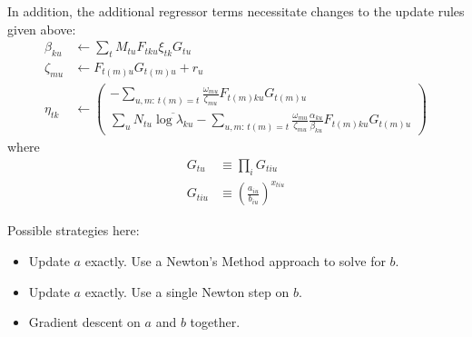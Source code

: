 \documentclass[11pt]{article}
\begin{document}
 In addition, the additional regressor terms necessitate changes to the update rules given above:
\begin{align}
    \beta_{ku} &\leftarrow \sum_t M_{tu} F_{tku} \xi_{tk} G_{tu} \\
    \zeta_{mu} &\leftarrow F_{t(m)u} G_{t(m)u} + r_u \\
    \eta_{tk} &\leftarrow
    \begin{pmatrix}
        -\sum_{u, m: \, t(m) = t} \frac{\omega_{mu}}{\zeta_{mu}} F_{t(m)ku}
        G_{t(m)u}\\
        \sum_u N_{tu} \overline{\log \lambda_{ku}} -
        \sum_{u, m: \, t(m) = t} \frac{\omega_{mu}} {\zeta_{mu}}\frac{\alpha_{ku}}{\beta_{ku}} F_{t(m)ku}  G_{t(m)u}
    \end{pmatrix}
\end{align}
where
\begin{align}
    G_{tu} &\equiv \prod_i G_{tiu} \\
    G_{tiu} &\equiv \left(\frac{a_{iu}}{b_{iu}} \right)^{x_{tiu}}
\end{align}

Possible strategies here:
\begin{itemize}
    \item Update $a$ exactly. Use a Newton's Method approach to solve for $b$.
    \item Update $a$ exactly. Use a single Newton step on $b$.
    \item Gradient descent on $a$ and $b$ together.
\end{itemize}
\end{document}

